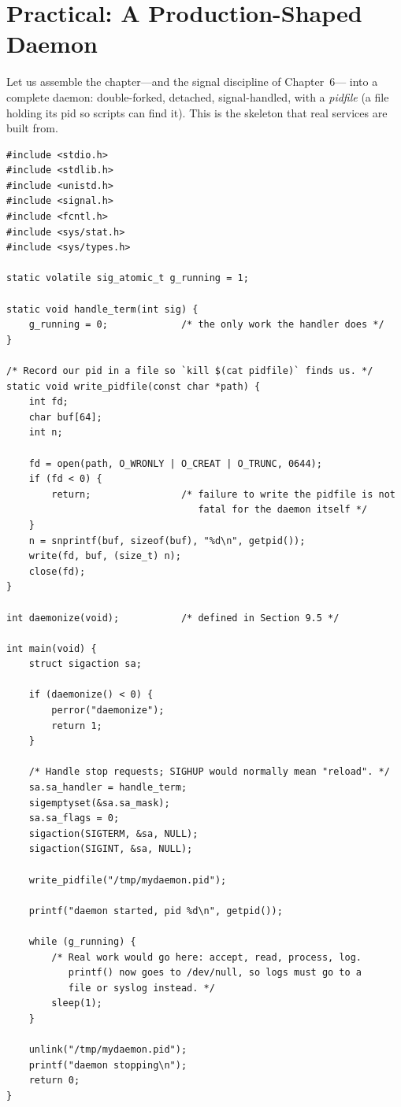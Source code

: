 \section{Practical: A Production-Shaped Daemon}

Let us assemble the chapter---and the signal discipline of Chapter~6---
into a complete daemon: double-forked, detached, signal-handled, with
a \emph{pidfile} (a file holding its pid so  scripts can
find it). This is the skeleton that real services are built from.

\begin{lstlisting}[caption={mydaemon.c: the full daemon life cycle.}]
#include <stdio.h>
#include <stdlib.h>
#include <unistd.h>
#include <signal.h>
#include <fcntl.h>
#include <sys/stat.h>
#include <sys/types.h>

static volatile sig_atomic_t g_running = 1;

static void handle_term(int sig) {
    g_running = 0;             /* the only work the handler does */
}

/* Record our pid in a file so `kill $(cat pidfile)` finds us. */
static void write_pidfile(const char *path) {
    int fd;
    char buf[64];
    int n;

    fd = open(path, O_WRONLY | O_CREAT | O_TRUNC, 0644);
    if (fd < 0) {
        return;                /* failure to write the pidfile is not
                                  fatal for the daemon itself */
    }
    n = snprintf(buf, sizeof(buf), "%d\n", getpid());
    write(fd, buf, (size_t) n);
    close(fd);
}

int daemonize(void);           /* defined in Section 9.5 */

int main(void) {
    struct sigaction sa;

    if (daemonize() < 0) {
        perror("daemonize");
        return 1;
    }

    /* Handle stop requests; SIGHUP would normally mean "reload". */
    sa.sa_handler = handle_term;
    sigemptyset(&sa.sa_mask);
    sa.sa_flags = 0;
    sigaction(SIGTERM, &sa, NULL);
    sigaction(SIGINT, &sa, NULL);

    write_pidfile("/tmp/mydaemon.pid");

    printf("daemon started, pid %d\n", getpid());

    while (g_running) {
        /* Real work would go here: accept, read, process, log.
           printf() now goes to /dev/null, so logs must go to a
           file or syslog instead. */
        sleep(1);
    }

    unlink("/tmp/mydaemon.pid");
    printf("daemon stopping\n");
    return 0;
}
\end{lstlisting}

